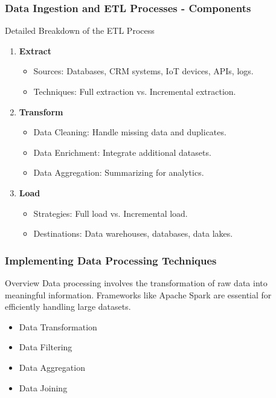 \documentclass[aspectratio=169]{beamer}
\begin{document}
\begin{frame}[fragile]
    \frametitle{Data Ingestion and ETL Processes - Components}
    \begin{block}{Detailed Breakdown of the ETL Process}
        \begin{enumerate}
            \item \textbf{Extract}
                \begin{itemize}
                    \item Sources: Databases, CRM systems, IoT devices, APIs, logs.
                    \item Techniques: Full extraction vs. Incremental extraction.
                \end{itemize}
            \item \textbf{Transform}
                \begin{itemize}
                    \item Data Cleaning: Handle missing data and duplicates.
                    \item Data Enrichment: Integrate additional datasets.
                    \item Data Aggregation: Summarizing for analytics.
                \end{itemize}
            \item \textbf{Load}
                \begin{itemize}
                    \item Strategies: Full load vs. Incremental load.
                    \item Destinations: Data warehouses, databases, data lakes.
                \end{itemize}
        \end{enumerate}
    \end{block}
\end{frame}

\begin{frame}[fragile]
    \frametitle{Implementing Data Processing Techniques}
    \begin{block}{Overview}
        Data processing involves the transformation of raw data into meaningful information. 
        Frameworks like Apache Spark are essential for efficiently handling large datasets. 
    \end{block}
    \begin{itemize}
        \item Data Transformation
        \item Data Filtering
        \item Data Aggregation
        \item Data Joining
    \end{itemize}
\end{frame}
\end{document}
